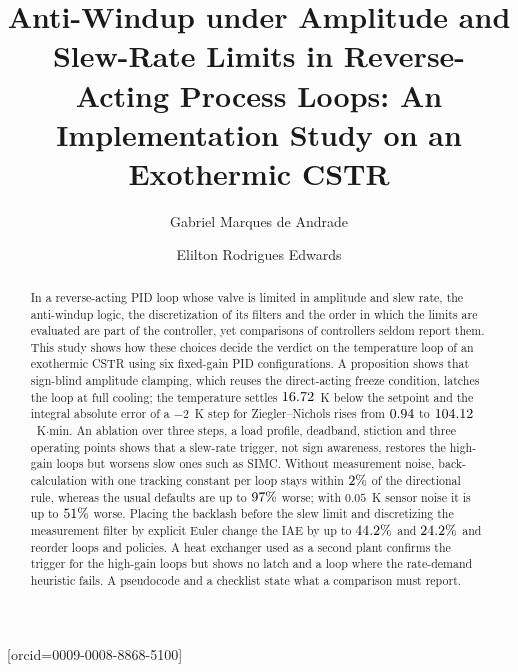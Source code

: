 \documentclass[a4paper,fleqn]{cas-dc}
\begin{document}
\let\WriteBookmarks\relax
\def\floatpagepagefraction{1}
\def\textpagefraction{.001}

\title [mode = title]{Anti-Windup under Amplitude and Slew-Rate Limits in Reverse-Acting Process Loops: An Implementation Study on an Exothermic CSTR}

\author[1]{Gabriel Marques de Andrade}[orcid=0009-0008-8868-5100]
\cormark[1]

\author[1]{Elilton Rodrigues Edwards}



\begin{abstract}
In a reverse-acting PID loop whose valve is limited in amplitude and slew rate, the anti-windup logic, the discretization of its filters and the order in which the limits are evaluated are part of the controller, yet comparisons of controllers seldom report them. This study shows how these choices decide the verdict on the temperature loop of an exothermic CSTR using six fixed-gain PID configurations. A proposition shows that sign-blind amplitude clamping, which reuses the direct-acting freeze condition, latches the loop at full cooling; the temperature settles $16.72$~K below the setpoint and the integral absolute error of a $-2$~K step for Ziegler--Nichols rises from $0.94$ to $104.12$~K$\cdot$min. An ablation over three steps, a load profile, deadband, stiction and three operating points shows that a slew-rate trigger, not sign awareness, restores the high-gain loops but worsens slow ones such as SIMC. Without measurement noise, back-calculation with one tracking constant per loop stays within $2\%$ of the directional rule, whereas the usual defaults are up to $97\%$ worse; with $0.05$~K sensor noise it is up to $51\%$ worse. Placing the backlash before the slew limit and discretizing the measurement filter by explicit Euler change the IAE by up to $44.2\%$ and $24.2\%$ and reorder loops and policies. A heat exchanger used as a second plant confirms the trigger for the high-gain loops but shows no latch and a loop where the rate-demand heuristic fails. A pseudocode and a checklist state what a comparison must report.
\end{abstract}
\end{document}
